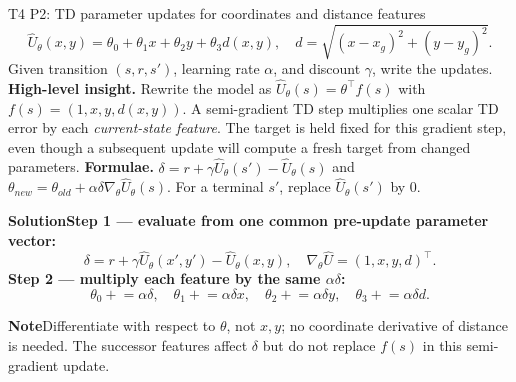 \documentclass[10pt,a4paper]{article}
\newcommand{\ans}{\par\smallskip\textbf{\color{good}Solution\quad}}
\newcommand{\pit}{\par\smallskip\textbf{\color{warn}Note\quad}}
\begin{document}
\begin{question}{T4 P2: TD parameter updates for coordinates and distance features}\label{q:t4p2}
\[
\hat U_\theta(x,y)=\theta_0+\theta_1x+\theta_2y+\theta_3d(x,y),
\quad d=\sqrt{(x-x_g)^2+(y-y_g)^2}.
\]
Given transition $(s,r,s')$, learning rate $\alpha$, and discount $\gamma$, write the updates.
\textbf{High-level insight.} Rewrite the model as $\hat U_\theta(s)=\theta^\top f(s)$ with $f(s)=(1,x,y,d(x,y))$. A semi-gradient TD step multiplies one scalar TD error by each \emph{current-state feature}. The target is held fixed for this gradient step, even though a subsequent update will compute a fresh target from changed parameters.
\textbf{Formulae.} $\delta=r+\gamma\hat U_\theta(s')-\hat U_\theta(s)$ and $\theta_{new}=\theta_{old}+\alpha\delta\nabla_\theta\hat U_\theta(s)$. For a terminal $s'$, replace $\hat U_\theta(s')$ by 0.
\ans \textbf{Step 1 --- evaluate from one common pre-update parameter vector:}
\[
\delta=r+\gamma\hat U_\theta(x',y')-\hat U_\theta(x,y),\quad
\nabla_\theta\hat U=(1,x,y,d)^\top.
\]
\textbf{Step 2 --- multiply each feature by the same $\alpha\delta$:}
\[
\boxed{\theta_0\mathrel{+}=\alpha\delta,\quad
\theta_1\mathrel{+}=\alpha\delta x,\quad
\theta_2\mathrel{+}=\alpha\delta y,\quad
\theta_3\mathrel{+}=\alpha\delta d.}
\]
\pit Differentiate with respect to $\theta$, not $x,y$; no coordinate derivative of distance is needed. The successor features affect $\delta$ but do not replace $f(s)$ in this semi-gradient update.
\end{question}
\end{document}
